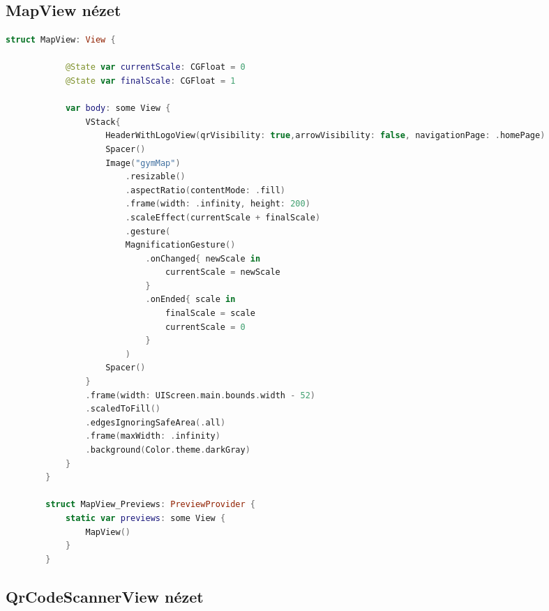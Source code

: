 \subsection*{MapView nézet}

\begin{spacing}{2}
\end{spacing}
\begin{minipage}{\textwidth}
    \linespread{0.8}\selectfont
    \begin{lstlisting}[language=swift]
        struct MapView: View {
            
            @State var currentScale: CGFloat = 0
            @State var finalScale: CGFloat = 1
            
            var body: some View {
                VStack{
                    HeaderWithLogoView(qrVisibility: true,arrowVisibility: false, navigationPage: .homePage)
                    Spacer()
                    Image("gymMap")
                        .resizable()
                        .aspectRatio(contentMode: .fill)
                        .frame(width: .infinity, height: 200)
                        .scaleEffect(currentScale + finalScale)
                        .gesture(
                        MagnificationGesture()
                            .onChanged{ newScale in
                                currentScale = newScale
                            }
                            .onEnded{ scale in
                                finalScale = scale
                                currentScale = 0
                            }
                        )
                    Spacer()
                }
                .frame(width: UIScreen.main.bounds.width - 52)
                .scaledToFill()
                .edgesIgnoringSafeArea(.all)
                .frame(maxWidth: .infinity)
                .background(Color.theme.darkGray)
            }
        }

        struct MapView_Previews: PreviewProvider {
            static var previews: some View {
                MapView()
            }
        }
    \end{lstlisting}   
\end{minipage}

\subsection*{QrCodeScannerView nézet}

